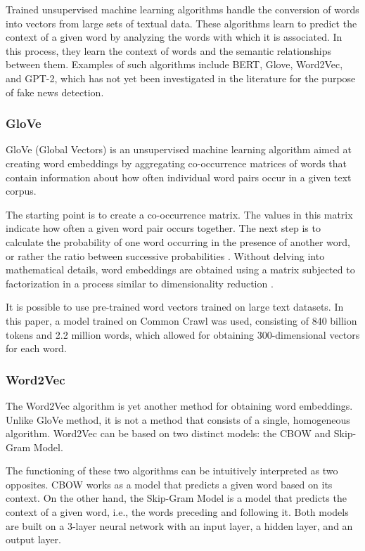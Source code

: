 Trained unsupervised machine learning algorithms handle the conversion of words into vectors from large sets of textual data. These algorithms learn to predict the context of a given word by analyzing the words with which it is associated. In this process, they learn the context of words and the semantic relationships between them. Examples of such algorithms include BERT, Glove, Word2Vec, and GPT-2, which has not yet been investigated in the literature for the purpose of fake news detection.

\subsubsection{GloVe}
GloVe (Global Vectors) is an unsupervised machine learning algorithm aimed at creating word embeddings by aggregating co-occurrence matrices of words that contain information about how often individual word pairs occur in a given text corpus.

The starting point is to create a co-occurrence matrix. The values in this matrix indicate how often a given word pair occurs together. The next step is to calculate the probability of one word occurring in the presence of another word, or rather the ratio between successive probabilities \autocite{Pennington2014}. Without delving into mathematical details, word embeddings are obtained using a matrix subjected to factorization in a process similar to dimensionality reduction \autocite{Albrecht2020}.

It is possible to use pre-trained word vectors trained on large text datasets. In this paper, a model trained on Common Crawl was used, consisting of 840 billion tokens and 2.2 million words, which allowed for obtaining 300-dimensional vectors for each word.

\subsubsection{Word2Vec}
The Word2Vec algorithm is yet another method for obtaining word embeddings. Unlike GloVe method, it is not a method that consists of a single, homogeneous algorithm. Word2Vec can be based on two distinct models: the CBOW and Skip-Gram Model.

The functioning of these two algorithms can be intuitively interpreted as two opposites. CBOW works as a model that predicts a given word based on its context. On the other hand, the Skip-Gram Model is a model that predicts the context of a given word, i.e., the words preceding and following it. Both models are built on a 3-layer neural network with an input layer, a hidden layer, and an output layer.

